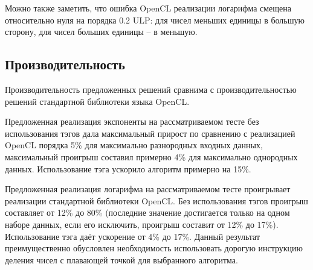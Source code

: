 
Можно также заметить, что ошибка OpenCL реализации логарифма смещена относительно нуля на порядка 0.2 ULP: для чисел меньших единицы в большую сторону, для чисел больших единицы -- в меньшую.

\subsection{Производительность}

Производительность предложенных решений сравнима с производительностью решений стандартной библиотеки языка OpenCL.

Предложенная реализация экспоненты на рассматриваемом тесте без использования тэгов дала максимальный прирост по сравнению с реализацией OpenCL порядка 5\% для максимально разнородных входных данных, максимальный проигрыш составил примерно 4\% для максимально однородных данных.
Использование тэга ускорило алгоритм примерно на 15\%.

Предложенная реализация логарифма на рассматриваемом тесте проигрывает реализации стандартной библиотеки OpenCL.
Без использования тэгов проигрыш составляет от 12\% до 80\% (последние значение достигается только на одном наборе данных, если его исключить, проигрыш составит от 12\% до 17\%).
Использование тэга даёт ускорение от 4\% до 17\%.
Данный результат преимущественно обусловлен необходимость использовать дорогую инструкцию деления чисел с плавающей точкой для выбранного алгоритма.

